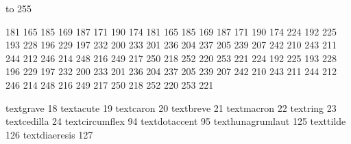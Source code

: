 

\startmapping[il2]

 to 255    %

 181 165    185 169
 187 171    190 174
 181 165    185 169
 187 171    190 174
 224 192    225 193
 228 196    229 197
 232 200    233 201
 236 204    237 205
 239 207    242 210
 243 211    244 212
 246 214    248 216
 249 217    250 218
 252 220    253 221
 224 192    225 193
 228 196    229 197
 232 200    233 201
 236 204    237 205
 239 207    242 210
 243 211    244 212
 246 214    248 216
 249 217    250 218
 252 220    253 221

\stopmapping

\startcoding[il2]

 textgrave          18
 textacute          19
 textcaron          20
 textbreve          21
 textmacron         22
 textring           23
 textcedilla        24
 textcircumflex     94
 textdotaccent      95
 texthunagrumlaut  125
 texttilde         126
 textdiaeresis     127

